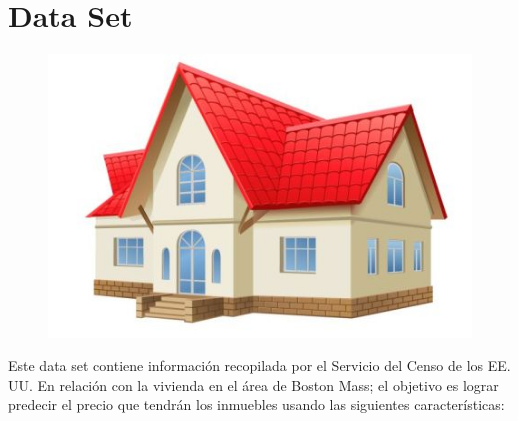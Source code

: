 \documentclass[11pt]{article}
\makeatletter
\def\maxwidth{\ifdim\Gin@nat@width>\linewidth\linewidth
    \else\Gin@nat@width\fi}
\let\Oldincludegraphics\includegraphics
\renewcommand{\includegraphics}[1]{\Oldincludegraphics[width=.8\maxwidth]{#1}}
\makeatother
\begin{document}
    \section{Data Set}\label{data-set}

    \begin{figure}
\centering
\includegraphics{images/house.png}
\caption{}
\end{figure}

    Este data set contiene información recopilada por el Servicio del Censo
de los EE. UU. En relación con la vivienda en el área de Boston Mass; el
objetivo es lograr predecir el precio que tendrán los inmuebles usando
las siguientes características:
\end{document}
